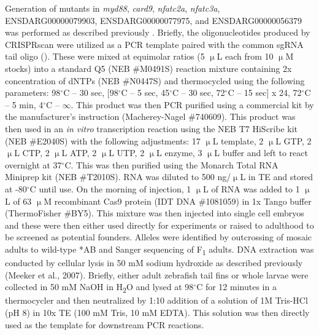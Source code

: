 Generation of mutants in \textit{myd88}, \textit{card9}, \textit{nfatc2a}, \textit{nfatc3a}, ENSDARG00000079903, ENSDARG00000077975, and ENSDARG00000056379 was performed as described previously \citep{MorenoMateos2015}. Briefly, the oligonucleotides produced by CRISPRscan were utilized as a PCR template paired with the common sgRNA tail oligo (). These were mixed at equimolar ratios (5 $\upmu$L each from 10 $\upmu$M stocks) into a standard Q5 (NEB \#M0491S) reaction mixture containing 2x concentration of dNTPs (NEB \#N0447S) and thermocycled using the following parameters: 98$^{\circ}$C -- 30 sec, [98$^{\circ}$C -- 5 sec, 45$^{\circ}$C -- 30 sec, 72$^{\circ}$C -- 15 sec] x 24, 72$^{\circ}$C -- 5 min, 4$^{\circ}$C -- $\infty$. This product was then PCR purified using a commercial kit by the manufacturer's instruction (Macherey-Nagel \#740609). This product was then used in an \textit{in vitro} transcription reaction using the NEB T7 HiScribe kit (NEB \#E2040S) with the following adjustments: 17 $\upmu$L template, 2 $\upmu$L GTP, 2 $\upmu$L CTP, 2 $\upmu$L ATP, 2 $\upmu$L UTP, 2 $\upmu$L enzyme, 3 $\upmu$L buffer and left to react overnight at 37$^{\circ}$C. This was then purified using the Monarch Total RNA Miniprep kit (NEB \#T2010S). RNA was diluted to 500 ng/$\upmu$L in TE and stored at \hyp{}80$^{\circ}$C until use. On the morning of injection, 1 $\upmu$L of RNA was added to 1 $\upmu$L of 63 $\upmu$M recombinant Cas9 protein (IDT DNA \#1081059) in 1x Tango buffer (ThermoFisher \#BY5). This mixture was then injected into single cell embryos and these were then either used directly for experiments or raised to adulthood to be screened as potential founders. Alleles were identified by outcrossing of mosaic adults to wild\hyp{}type *AB and Sanger sequencing of F\textsubscript{1} adults. DNA extraction was conducted by cellular lysis in 50 mM sodium hydroxide as described previously (Meeker et al., 2007). Briefly, either adult zebrafish tail fins or whole larvae were collected in 50 mM NaOH in H\textsubscript{2}O and lysed at 98$^{\circ}$C for 12 minutes in a thermocycler and then neutralized by 1:10 addition of a solution of 1M Tris\hyp{}HCl (pH 8) in 10x TE (100 mM Tris, 10 mM EDTA). This solution was then directly used as the template for downstream PCR reactions. 

